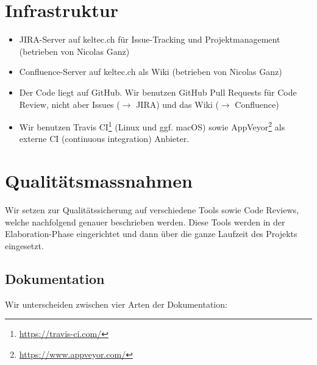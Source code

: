 \documentclass[a4paper]{article}
\let\oldsection\section
\renewcommand\section{\clearpage\oldsection}
\begin{document}
\section{Infrastruktur}
\begin{itemize}
  \item JIRA-Server auf keltec.ch für Issue-Tracking und Projektmanagement
    (betrieben von Nicolas Ganz)
  \item Confluence-Server auf keltec.ch als Wiki (betrieben von Nicolas Ganz)
  \item Der Code liegt auf GitHub.
    Wir benutzen GitHub Pull Requests für Code Review, nicht aber Issues ($\rightarrow$ JIRA)
    und das Wiki ($\rightarrow$ Confluence)
  \item Wir benutzen Travis CI\footnote{\url{https://travis-ci.com/}} (Linux und
    ggf. macOS) sowie AppVeyor\footnote{\url{https://www.appveyor.com/}} als
    externe CI (continuous integration) Anbieter.
\end{itemize}

\section{Qualitätsmassnahmen}
%

Wir setzen zur Qualitätssicherung auf verschiedene Tools sowie Code Reviews,
welche nachfolgend genauer beschrieben werden. Diese Tools werden in der
Elaboration-Phase eingerichtet und dann über die ganze Laufzeit des Projekts
eingesetzt.

\subsection{Dokumentation}

Wir unterscheiden zwischen vier Arten der Dokumentation:
\end{document}
